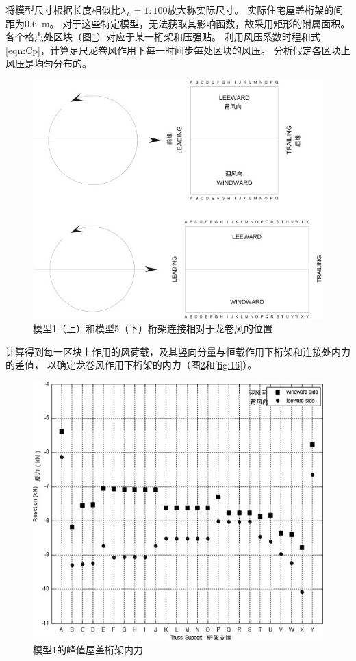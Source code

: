 \documentclass{ctexart}
\begin{document}
将模型尺寸根据长度相似比$\lambda_L=1:100$放大称实际尺寸。
实际住宅屋盖桁架的间距为\SI{0.6}{m}。
对于这些特定模型，无法获取其影响函数，故采用矩形的附属面积。
各个格点处区块（图\ref{fig:14}）对应于某一桁架和压强贴。
利用风压系数时程和式\ref{eqn:Cp}，计算足尺龙卷风作用下每一时间步每处区块的风压。
分析假定各区块上风压是均匀分布的。

\begin{figure}
\centering
\includegraphics{./fig/14.jpg}
\caption{模型1（上）和模型5（下）桁架连接相对于龙卷风的位置}
\label{fig:14}
\end{figure}


计算得到每一区块上作用的风荷载，及其竖向分量与恒载作用下桁架和连接处内力的差值，
以确定龙卷风作用下桁架的内力（图\ref{fig:15}和\ref{fig:16}）。

\begin{figure}
\centering
\includegraphics{./fig/15.jpg}
\caption{模型1的峰值屋盖桁架内力}
\label{fig:15}
\end{figure}
\end{document}
